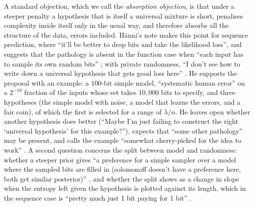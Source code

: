 A standard objection, which we call the \emph{absorption objection}, is that under a steeper penalty a hypothesis that is itself a universal mixture is short, penalises complexity inside itself only in the usual way, and therefore absorbs all the structure of the data, errors included. H\"anni's note makes this point for sequence prediction, where ``it'll be better to drop bits and take the likelihood loss'', and suggests that the pathology is absent in the function case when ``each input has to sample its own random bits'' \citep{hanni2026notes}; with private randomness, ``I don't see how to write down a universal hypothesis that gets good loss here'' \citep{hanni2026lesswrong}. He supports the proposal with an example: a $100$-bit simple model, ``systematic human error'' on a $2^{-10}$ fraction of the inputs whose set takes $10{,}000$ bits to specify, and three hypotheses (the simple model with noise, a model that learns the errors, and a fair coin), of which the first is selected for a range of $\lambda/n$. He leaves open whether another hypothesis does better (``Maybe I'm just failing to construct the right `universal hypothesis' for this example?''), expects that ``some other pathology'' may be present, and calls the example ``somewhat cherry-picked for the idea to work'' \citep{hanni2026lesswrong}. A second question concerns the split between model and randomness: whether a steeper prior gives ``a preference for a simple sampler over a model where the sampled bits are filled in (solomonoff doesn't have a preference here, both get similar posterior)'' \citep{hanni2026request}, and whether the split shows as a change in slope when the entropy left given the hypothesis is plotted against its length, which in the sequence case is ``pretty much just 1 bit paying for 1 bit'' \citep{hanni2026notes}.

